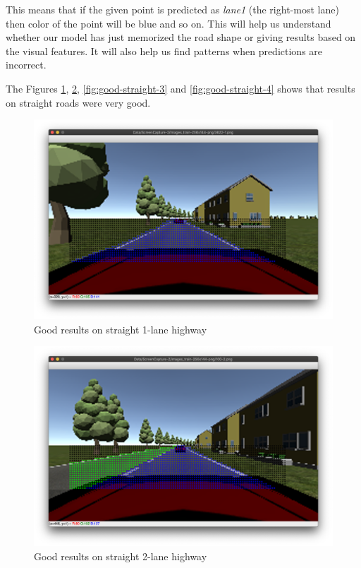\par
This means that if the given point is predicted as \textit{lane1} (the right-most lane) then color of the point will be blue and so on. This will help us understand whether our model has just memorized the road shape or giving results based on the visual features. It will also help us find patterns when predictions are incorrect.
\par
The Figures \ref{fig:good-straight-1}, \ref{fig:good-straight-2}, \ref{fig:good-straight-3} and \ref{fig:good-straight-4} shows that results on straight roads were very good.

\begin{figure}[H]
  \centering
  \includegraphics[scale=0.31]{images/Chapter5/lane1-straight-green.png}
  \caption{Good results on straight 1-lane highway}
  \label{fig:good-straight-1}
\end{figure}
\begin{figure}[H]
  \centering
  \includegraphics[scale=0.31]{images/Chapter5/lane2-straight-green.png}
  \caption{Good results on straight 2-lane highway}
  \label{fig:good-straight-2}
\end{figure}
